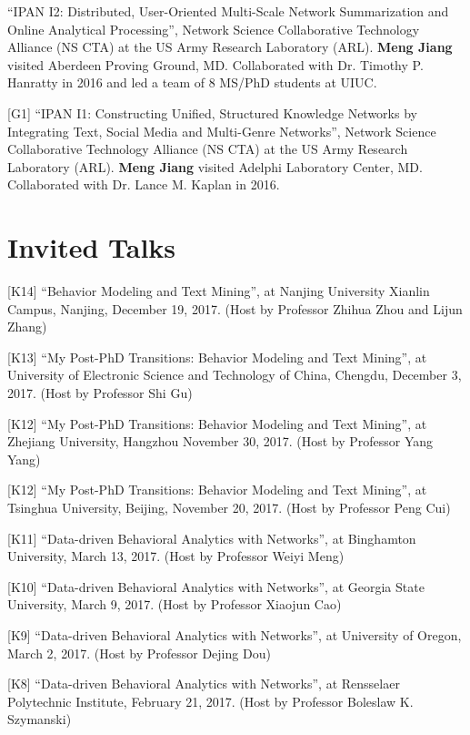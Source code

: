 \documentclass[margin, 9pt]{res}
\begin{document}
\begin{resume}
[G2] ``IPAN I2: Distributed, User-Oriented Multi-Scale Network Summarization and Online Analytical Processing'', Network Science Collaborative Technology Alliance (NS CTA) at the US Army Research Laboratory (ARL). \textbf{Meng Jiang} visited Aberdeen Proving Ground, MD. Collaborated with Dr. Timothy P. Hanratty in 2016 and led a team of 8 MS/PhD students at UIUC.

[G1] ``IPAN I1: Constructing Unified, Structured Knowledge Networks by Integrating Text, Social Media and Multi-Genre Networks'', Network Science Collaborative Technology Alliance (NS CTA) at the US Army Research Laboratory (ARL). \textbf{Meng Jiang} visited Adelphi Laboratory Center, MD. Collaborated with Dr. Lance M. Kaplan in 2016.


\section{Invited Talks}

[K14] ``Behavior Modeling and Text Mining'', at Nanjing University Xianlin Campus, Nanjing, December 19, 2017. (Host by Professor Zhihua Zhou and Lijun Zhang)

[K13] ``My Post-PhD Transitions: Behavior Modeling and Text Mining'', at University of Electronic Science and Technology of China, Chengdu, December 3, 2017. (Host by Professor Shi Gu)

[K12] ``My Post-PhD Transitions: Behavior Modeling and Text Mining'', at Zhejiang University, Hangzhou November 30, 2017. (Host by Professor Yang Yang)

[K12] ``My Post-PhD Transitions: Behavior Modeling and Text Mining'', at Tsinghua University, Beijing, November 20, 2017. (Host by Professor Peng Cui)

[K11] ``Data-driven Behavioral Analytics with Networks'', at Binghamton University, March 13, 2017. (Host by Professor Weiyi Meng)

[K10] ``Data-driven Behavioral Analytics with Networks'', at Georgia State University, March 9, 2017. (Host by Professor Xiaojun Cao)

[K9] ``Data-driven Behavioral Analytics with Networks'', at University of Oregon, March 2, 2017. (Host by Professor Dejing Dou)

[K8] ``Data-driven Behavioral Analytics with Networks'', at Rensselaer Polytechnic Institute, February 21, 2017. (Host by Professor Boleslaw K. Szymanski)


\end{resume}
\end{document}
